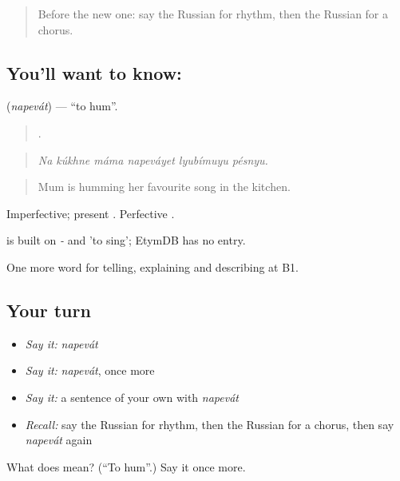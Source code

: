 \begin{quote}
Before the new one: say the Russian for rhythm, then the Russian for a chorus.
\end{quote}

\subsection*{You'll want to know: }
\textbf{} (\emph{napevát}) — \textquotedblleft{}to hum\textquotedblright{}.

\begin{quote}
     .
\end{quote}

\begin{quote}
\emph{Na kúkhne máma napeváyet lyubímuyu pésnyu.}
\end{quote}

\begin{quote}
Mum is humming her favourite song in the kitchen.
\end{quote}

Imperfective; present . Perfective .

\begin{cousinweb}
\emph{} is built on \emph{-} and \emph{} 'to sing'; EtymDB has no entry.
\end{cousinweb}

\begin{grammarlens}[title={What you've built}]
One more word for telling, explaining and describing at B1.
\end{grammarlens}

\subsection*{Your turn}
\begin{itemize}
\raggedright
  \item \emph{Say it:} \emph{napevát}
  \item \emph{Say it:} \emph{napevát}, once more
  \item \emph{Say it:} a sentence of your own with \emph{napevát}
  \item \emph{Recall:} say the Russian for rhythm, then the Russian for a chorus, then say \emph{napevát} again
\end{itemize}

\begin{tcolorbox}[breakable,colback=teal!4,colframe=teal!35!black,title={Before you move on}]
What does  mean? (\textquotedblleft{}To hum\textquotedblright{}.) Say it once more.
\end{tcolorbox}
